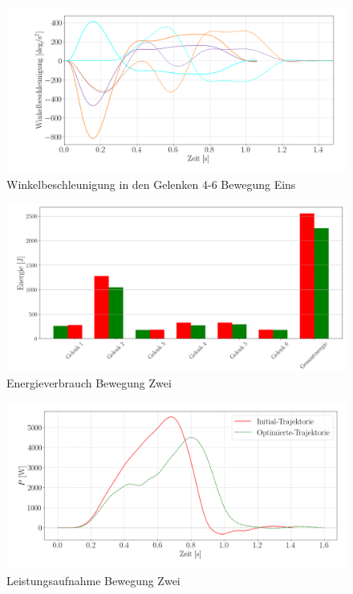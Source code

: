 \begin{figure}[tbph]
	\centering
	\includegraphics[width=1\linewidth]{images/accdown2}
	\caption{Winkelbeschleunigung in den Gelenken 4-6 Bewegung Eins}
	\label{fig:accdown2}
\end{figure}
%
%
%
%
\begin{figure}[tbph]
	\centering
	\includegraphics[width=1\linewidth]{images/e_up500}
	\caption{Energieverbrauch Bewegung Zwei}
	\label{fig:eup500}
\end{figure}
\begin{figure}[tbph]
	\centering
	\includegraphics[width=1\linewidth]{images/P_up}
	\caption{Leistungsaufnahme Bewegung Zwei}
	\label{fig:pup}
\end{figure}
